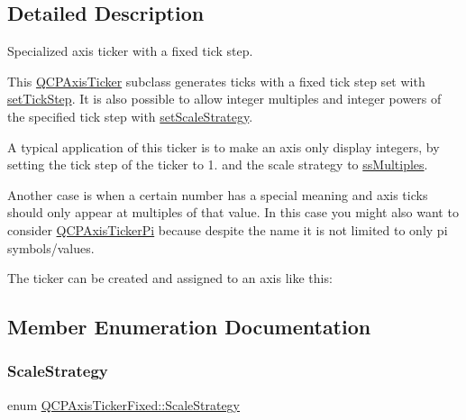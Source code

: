 \subsection{Detailed Description}
Specialized axis ticker with a fixed tick step. 



This \mbox{\hyperlink{class_q_c_p_axis_ticker}{Q\+C\+P\+Axis\+Ticker}} subclass generates ticks with a fixed tick step set with \mbox{\hyperlink{class_q_c_p_axis_ticker_fixed_a4bc83d85a4f81d4abdd3fa5042d7b833}{set\+Tick\+Step}}. It is also possible to allow integer multiples and integer powers of the specified tick step with \mbox{\hyperlink{class_q_c_p_axis_ticker_fixed_acbc7c9bcd80b3dc3edee5f0519d301f6}{set\+Scale\+Strategy}}.

A typical application of this ticker is to make an axis only display integers, by setting the tick step of the ticker to 1. and the scale strategy to \mbox{\hyperlink{class_q_c_p_axis_ticker_fixed_a15b3d38b935d404b1311eb85cfb6a439a22f651785f6412645837421896561104}{ss\+Multiples}}.

Another case is when a certain number has a special meaning and axis ticks should only appear at multiples of that value. In this case you might also want to consider \mbox{\hyperlink{class_q_c_p_axis_ticker_pi}{Q\+C\+P\+Axis\+Ticker\+Pi}} because despite the name it is not limited to only pi symbols/values.

The ticker can be created and assigned to an axis like this\+: 
\begin{DoxyCodeInclude}{0}
\end{DoxyCodeInclude}


\subsection{Member Enumeration Documentation}
\mbox{\label{class_q_c_p_axis_ticker_fixed_a15b3d38b935d404b1311eb85cfb6a439}} 
\subsubsection{\texorpdfstring{ScaleStrategy}{ScaleStrategy}}
{\footnotesize\ttfamily enum \mbox{\hyperlink{class_q_c_p_axis_ticker_fixed_a15b3d38b935d404b1311eb85cfb6a439}{Q\+C\+P\+Axis\+Ticker\+Fixed\+::\+Scale\+Strategy}}}

